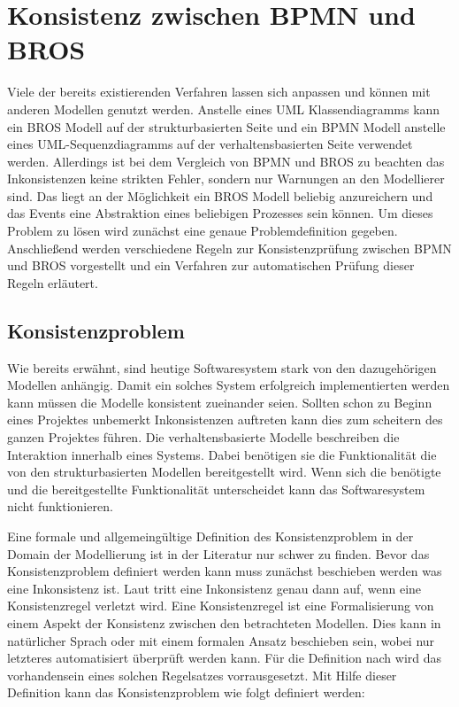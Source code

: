 \chapter{Konsistenz zwischen BPMN und BROS}
\label{chap:consistency}

Viele der bereits existierenden Verfahren lassen sich anpassen und können mit anderen Modellen genutzt werden. 
Anstelle eines UML Klassendiagramms kann ein BROS Modell auf der strukturbasierten Seite und ein BPMN Modell anstelle eines UML-Sequenzdiagramms auf der verhaltensbasierten Seite verwendet werden.
Allerdings ist bei dem Vergleich von BPMN und BROS zu beachten das Inkonsistenzen keine strikten Fehler, sondern nur Warnungen an den Modellierer sind.
Das liegt an der Möglichkeit ein BROS Modell beliebig anzureichern und das Events eine Abstraktion eines beliebigen Prozesses sein können.
Um dieses Problem zu lösen wird zunächst eine genaue Problemdefinition gegeben.
Anschließend werden verschiedene Regeln zur Konsistenzprüfung zwischen BPMN und BROS vorgestellt und ein Verfahren zur automatischen Prüfung dieser Regeln erläutert.

\section{Konsistenzproblem}

Wie bereits erwähnt, sind heutige Softwaresystem stark von den dazugehörigen Modellen anhängig.
Damit ein solches System erfolgreich implementierten werden kann müssen die Modelle konsistent zueinander seien.
Sollten schon zu Beginn eines Projektes unbemerkt Inkonsistenzen auftreten kann dies zum scheitern des ganzen Projektes führen.
Die verhaltensbasierte Modelle beschreiben die Interaktion innerhalb eines Systems.
Dabei benötigen sie die Funktionalität die von den strukturbasierten Modellen bereitgestellt wird.
Wenn sich die benötigte und die bereitgestellte Funktionalität unterscheidet kann das Softwaresystem nicht funktionieren.

Eine formale und allgemeingültige Definition des Konsistenzproblem in der Domain der Modellierung ist in der Literatur nur schwer zu finden.
Bevor das Konsistenzproblem definiert werden kann muss zunächst beschieben werden was eine Inkonsistenz ist.
Laut \cite{Nuseibeh1996} tritt eine Inkonsistenz genau dann auf, wenn eine Konsistenzregel verletzt wird.
Eine Konsistenzregel ist eine Formalisierung von einem Aspekt der Konsistenz zwischen den betrachteten Modellen.
Dies kann in natürlicher Sprach oder mit einem formalen Ansatz beschieben sein, wobei nur letzteres automatisiert überprüft werden kann.
Für die Definition nach \cite{Nuseibeh1996} wird das vorhandensein eines solchen Regelsatzes vorrausgesetzt.
Mit Hilfe dieser Definition kann das Konsistenzproblem wie folgt definiert werden:

